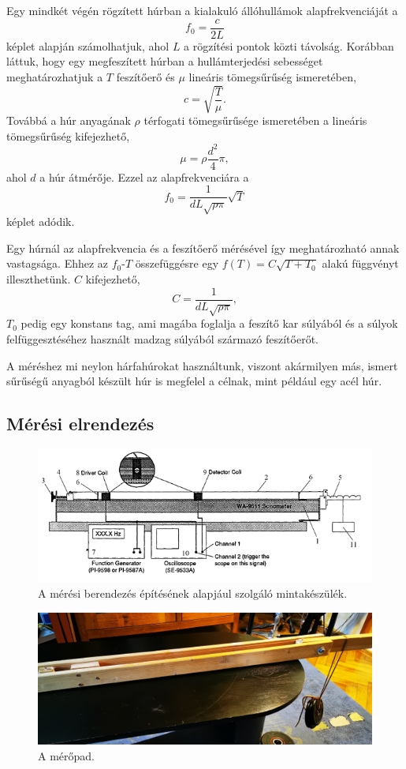\documentclass[a4paper,12pt]{article}
\begin{document}
Egy mindkét végén rögzített húrban a kialakuló állóhullámok alapfrekvenciáját a
$$ f_0 = \frac{c}{2 L} $$
képlet alapján számolhatjuk, ahol $L$ a rögzítési pontok közti távolság. Korábban láttuk, hogy egy megfeszített húrban a hullámterjedési sebességet meghatározhatjuk a $T$ feszítőerő és $\mu$ lineáris tömegsűrűség ismeretében,
$$ c = \sqrt{\frac{T}{\mu}}. $$
Továbbá a húr anyagának $\rho$ térfogati tömegsűrűsége ismeretében a lineáris tömegsűrűség kifejezhető,
$$ \mu = \rho \frac{d^2}{4} \pi, $$
ahol $d$ a húr átmérője. Ezzel az alapfrekvenciára a
$$ f_0 = \frac{1}{d L \sqrt{\rho \pi}} \sqrt{T} $$
képlet adódik.

Egy húrnál az alapfrekvencia és a feszítőerő mérésével így meghatározható annak vastagsága. Ehhez az $f_0$-$T$ összefüggésre egy $f(T) = C \sqrt{T + T_0}$ alakú függvényt illeszthetünk. $C$ kifejezhető,
$$ C = \frac{1}{d L \sqrt{\rho \pi}}, $$
$T_0$ pedig egy konstans tag, ami magába foglalja a feszítő kar súlyából és a súlyok felfüggesztéséhez használt madzag súlyából származó feszítőerőt.

A méréshez mi neylon hárfahúrokat használtunk, viszont akármilyen más, ismert sűrűségű anyagból készült húr is megfelel a célnak, mint például egy acél húr.

\subsection{Mérési elrendezés}

\begin{figure}[h!]
\centering
\includegraphics[width =.6\textwidth]{berendezes1.png}
\caption{A mérési berendezés építésének alapjául szolgáló mintakészülék. \cite{mintamuszer}}
\label{muszer_abra}
\end{figure}

\begin{figure}[h!]
\centering
\includegraphics[width = \linewidth]{elejesullyal.jpg}
\caption{A mérőpad.}
\label{muszer}
\end{figure}
\end{document}
